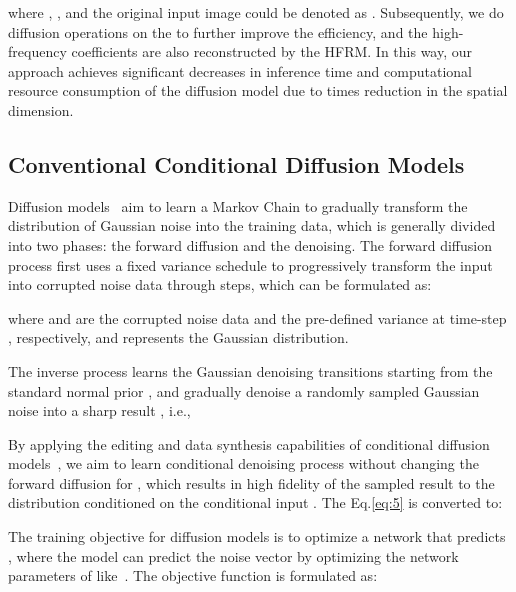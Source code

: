 where , ,  and the original input image could be denoted as . Subsequently, we do diffusion operations on the  to further improve the efficiency, and the high-frequency coefficients  are also reconstructed by the HFRM. In this way, our approach achieves significant decreases in inference time and computational resource consumption of the diffusion model due to  times reduction in the spatial dimension.

\subsection{Conventional Conditional Diffusion Models}\label{subsec:Conventional Conditional Diffusion Models}
Diffusion models~\cite{ddim,ddpm} aim to learn a Markov Chain to gradually transform the distribution of Gaussian noise into the training data, which is generally divided into two phases: the forward diffusion and the denoising. The forward diffusion process first uses a fixed variance schedule  to progressively transform the input  into corrupted noise data  through  steps, which can be formulated as:


where  and  are the corrupted noise data and the pre-defined variance at time-step , respectively, and  represents the Gaussian distribution.

The inverse process learns the Gaussian denoising transitions starting from the standard normal prior , and gradually denoise a randomly sampled Gaussian noise  into a sharp result , i.e.,

By applying the editing and data synthesis capabilities of conditional diffusion models~\cite{conditional_ddpm}, we aim to learn conditional denoising process  without changing the forward diffusion for , which results in high fidelity of the sampled result to the distribution conditioned on the conditional input . The Eq.\ref{eq:5} is converted to:


The training objective for diffusion models is to optimize a network  that predicts , where the model can predict the noise vector  by optimizing the network parameters  of  like~\cite{ddpm}. The objective function is formulated as:


